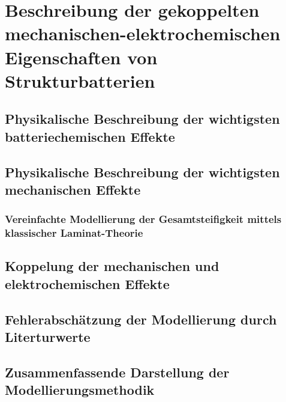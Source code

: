 \chapter{Beschreibung der gekoppelten mechanischen-elektrochemischen Eigenschaften von Strukturbatterien}

\section{Physikalische Beschreibung der wichtigsten batteriechemischen Effekte}



\section{Physikalische Beschreibung der wichtigsten mechanischen Effekte}
\subsection{Vereinfachte Modellierung der Gesamtsteifigkeit mittels klassischer Laminat-Theorie}

\section{Koppelung der mechanischen und elektrochemischen Effekte}


\section{Fehlerabschätzung der Modellierung durch Literturwerte}

\section{Zusammenfassende Darstellung der Modellierungsmethodik}